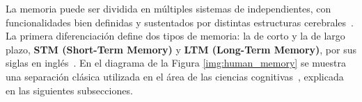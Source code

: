 La memoria puede ser dividida en múltiples sistemas de independientes, con funcionalidades bien definidas y sustentados por distintas estructuras cerebrales~\cite{pmid-Squire}. La primera diferenciación define dos tipos de memoria: la de corto y la de largo plazo, \textbf{STM (Short-Term Memory)} y \textbf{LTM (Long-Term Memory)}, por sus siglas en inglés~\cite{pmid10643472}. En el diagrama de la Figura \ref{img:human_memory} se muestra una separación clásica utilizada en el área de las ciencias cognitivas~\cite{Eichenbaum:2008}, explicada en las siguientes subsecciones.

\usetikzlibrary{arrows,shapes,positioning,shadows,trees}


